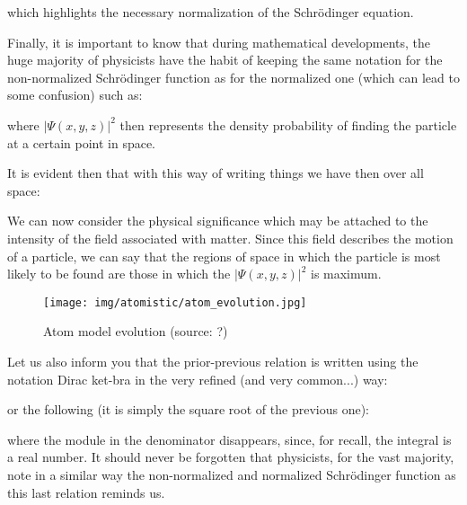 	which highlights the necessary normalization of the Schrödinger equation.
	
	Finally, it is important to know that during mathematical developments, the huge majority of physicists have the habit of keeping the same notation for the non-normalized Schrödinger function as for the normalized one (which can lead to some confusion) such as:
	
	where $\lvert\Psi(x,y,z)\rvert^2$ then represents the density probability of finding the particle at a certain point in space.
	
	It is evident then that with this way of writing things we have then over all space:
	
	We can now consider the physical significance which may be attached to the intensity of the field associated with matter. Since this field describes the motion of a particle, we can say that the regions of space in which the particle is most likely to be found are those in which the $\lvert\Psi(x,y,z)\rvert^2$ is maximum.
	\begin{figure}[H]
		\centering
		\texttt{[image: img/atomistic/atom\_evolution.jpg]}
		\caption[Atom model evolution]{Atom model evolution (source: ?)}
	\end{figure}
	Let us also inform you that the prior-previous relation is written using the notation Dirac ket-bra in the very refined (and very common...) way:
	
	or the following (it is simply the square root of the previous one):
	
	where the module in the denominator disappears, since, for recall, the integral is a real number. It should never be forgotten that physicists, for the vast majority, note in a similar way the non-normalized and normalized Schrödinger function as this last relation reminds us.
	

